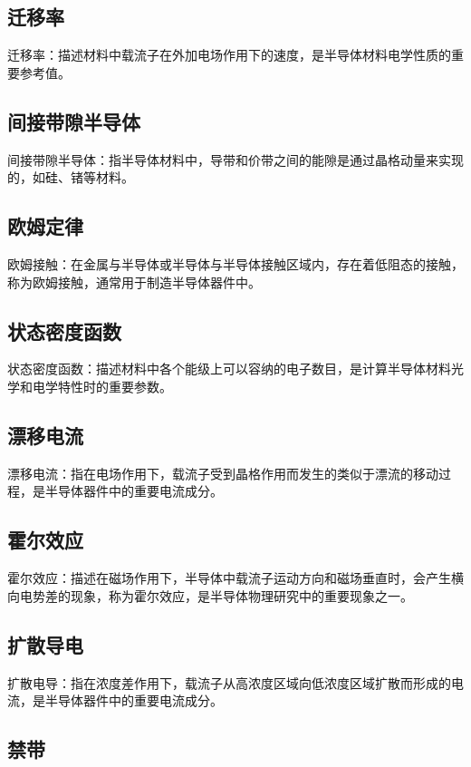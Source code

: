 \documentclass[UTF8]{ctexart}   %
\begin{document}
\subsection{迁移率}

迁移率：描述材料中载流子在外加电场作用下的速度，是半导体材料电学性质的重要参考值。

\subsection{间接带隙半导体}

间接带隙半导体：指半导体材料中，导带和价带之间的能隙是通过晶格动量来实现的，如硅、锗等材料。

\subsection{欧姆定律}

欧姆接触：在金属与半导体或半导体与半导体接触区域内，存在着低阻态的接触，称为欧姆接触，通常用于制造半导体器件中。

\subsection{状态密度函数}

状态密度函数：描述材料中各个能级上可以容纳的电子数目，是计算半导体材料光学和电学特性时的重要参数。

\subsection{漂移电流}

漂移电流：指在电场作用下，载流子受到晶格作用而发生的类似于漂流的移动过程，是半导体器件中的重要电流成分。

\subsection{霍尔效应}

霍尔效应：描述在磁场作用下，半导体中载流子运动方向和磁场垂直时，会产生横向电势差的现象，称为霍尔效应，是半导体物理研究中的重要现象之一。

\subsection{扩散导电}

扩散电导：指在浓度差作用下，载流子从高浓度区域向低浓度区域扩散而形成的电流，是半导体器件中的重要电流成分。

\subsection{禁带}
\end{document}
